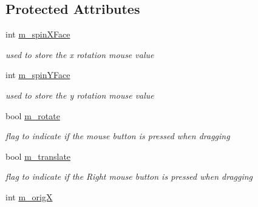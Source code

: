 \subsection*{Protected Attributes}
\begin{DoxyCompactItemize}
\item 
\hypertarget{classNGLDraw_a333a68dffb2f17de902059bdde7d1d55}{
int \hyperlink{classNGLDraw_a333a68dffb2f17de902059bdde7d1d55}{m\_\-spinXFace}}
\label{classNGLDraw_a333a68dffb2f17de902059bdde7d1d55}

\begin{DoxyCompactList}\small\item\em used to store the x rotation mouse value \item\end{DoxyCompactList}\item 
\hypertarget{classNGLDraw_a18af23a99a457663dd95efeb7e7b3455}{
int \hyperlink{classNGLDraw_a18af23a99a457663dd95efeb7e7b3455}{m\_\-spinYFace}}
\label{classNGLDraw_a18af23a99a457663dd95efeb7e7b3455}

\begin{DoxyCompactList}\small\item\em used to store the y rotation mouse value \item\end{DoxyCompactList}\item 
\hypertarget{classNGLDraw_ae6da031d343135a463a5aa4892447d78}{
bool \hyperlink{classNGLDraw_ae6da031d343135a463a5aa4892447d78}{m\_\-rotate}}
\label{classNGLDraw_ae6da031d343135a463a5aa4892447d78}

\begin{DoxyCompactList}\small\item\em flag to indicate if the mouse button is pressed when dragging \item\end{DoxyCompactList}\item 
\hypertarget{classNGLDraw_ad549b3e151ea79b8c7a29f8b55188e74}{
bool \hyperlink{classNGLDraw_ad549b3e151ea79b8c7a29f8b55188e74}{m\_\-translate}}
\label{classNGLDraw_ad549b3e151ea79b8c7a29f8b55188e74}

\begin{DoxyCompactList}\small\item\em flag to indicate if the Right mouse button is pressed when dragging \item\end{DoxyCompactList}\item 
\hypertarget{classNGLDraw_ada7472b4a58d4062efdd74c39f0909b7}{
int \hyperlink{classNGLDraw_ada7472b4a58d4062efdd74c39f0909b7}{m\_\-origX}}
\label{classNGLDraw_ada7472b4a58d4062efdd74c39f0909b7}


\end{DoxyCompactItemize}
